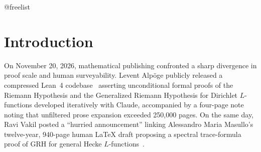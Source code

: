 \documentclass[11pt,a4paper]{article}
\makeatletter
\providecommand{\FloatBarrier}{%
  \par
  \expandafter\ifx\csname @freelist\endcsname\relax\else
    \ifx\@deferlist\@empty\else
      \clearpage
    \fi
  \fi
}
\let\orig@section\section
\renewcommand{\section}{\FloatBarrier\orig@section}
\makeatother
\begin{document}
\begin{abstract}
12/453 [2.65\%] total and 8/345 [2.32\%] proof-bearing statements linked, 0 direct ledger rows in \texttt{ReciprocityTheory}, 12/12 residual packages in \texttt{MECHANISM\_PACKAGED}, 29 explicit omissions, 0/20 priority literature-boundary items fully reconciled, and a pending refactor-equivalence check onto \texttt{lsernau/grh-lean}). Finally, we document how a 64\,GB workstation encounters a 46.47\,GB virtual-memory wall prior to the externally reported 61.57\,GB flat NDJSON serialization size, how module-by-module \texttt{.olean} replay with \texttt{lean4lean} (\texttt{67f63b0c}) closes all 175,187 / 175,187 project modules (1,927,488 declarations, 0 failures in 204,972.82\,s) under explicitly bounded precompiled-\texttt{Mathlib} and elevated-fuel assumptions (17 escalated modules enumerated in full), and extract six methodological safeguards for automated auditing pipelines.
\end{abstract}

\section{Introduction}

On November 20, 2026, mathematical publishing confronted a sharp divergence in proof scale and human surveyability. Levent Alp{\"o}ge publicly released a compressed Lean~4 codebase~\cite{alpoge2026} asserting unconditional formal proofs of the Riemann Hypothesis and the Generalized Riemann Hypothesis for Dirichlet $L$-functions developed iteratively with Claude, accompanied by a four-page note noting that unfiltered prose expansion exceeded 250,000 pages. On the same day, Ravi Vakil posted a ``hurried announcement'' linking Alessandro Maria Masullo's twelve-year, 940-page human \LaTeX{} draft proposing a spectral trace-formula proof of GRH for general Hecke $L$-functions~\cite{vakil2026}.
\end{document}
